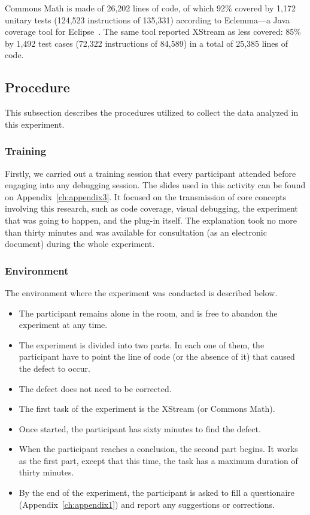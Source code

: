 Commons Math is made of 26,202 lines of code, of which 92\% covered by
1,172 unitary tests (124,523 instructions of 135,331) according to
Eclemma---a Java coverage tool for Eclipse~\cite{hoffmann2009eclemma}.
The same tool reported XStream as less covered: 85\% by 1,492 test
cases (72,322 instructions of 84,589) in a total of 25,385 lines of code.

\subsection{Procedure}

This subsection describes the procedures utilized to collect the data analyzed
in this experiment.

\subsubsection{Training}

Firstly, we carried out a training session that every participant attended
before engaging into any debugging session.
The slides used in this activity can be found on Appendix~\ref{ch:appendix3}. It
focused on the transmission of core concepts involving this research, such as
code coverage, visual debugging, the experiment that was going to happen, and
the plug-in itself. The explanation took no more than thirty minutes and was
available for consultation (as an electronic document) during the whole
experiment.

\subsubsection{Environment}

The environment where the experiment was conducted is described below.

\begin{itemize}
  \item The participant remains alone in the room, and is free to abandon the
  experiment at any time.
  \item The experiment is divided into two parts. In each one of them, the
  participant have to point the line of code (or the absence of it) that caused
  the defect to occur.
  \item The defect does not need to be corrected.
  \item The first task of the experiment is the XStream (or Commons Math).
  \item Once started, the participant has sixty minutes to find the defect.
  \item When the participant reaches a conclusion, the second part begins. It
  works as the first part, except that this time, the task has a maximum
  duration of thirty minutes.
  \item By the end of the experiment, the participant is asked to fill a
  questionaire (Appendix~\ref{ch:appendix1}) and report any suggestions or
  corrections.
\end{itemize}

